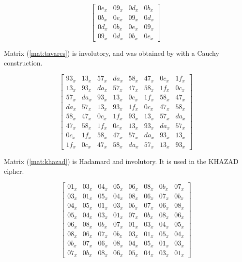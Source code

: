 \begin{equation}\label{mat:square-inv}
\begin{bmatrix}
0e_x & 09_x & 0d_x & 0b_x\\
0b_x & 0e_x & 09_x & 0d_x\\
0d_x & 0b_x & 0e_x & 09_x\\
09_x & 0d_x & 0b_x & 0e_x
\end{bmatrix}
\end{equation}

Matrix (\ref{mat:tavares}) is involutory, and was obtained by \cite{Youssef1997} with a Cauchy construction.

\begin{equation}\label{mat:tavares}
\begin{bmatrix}
93_x & 13_x & 57_x & da_x & 58_x & 47_x & 0c_x & 1f_x\\
13_x & 93_x & da_x & 57_x & 47_x & 58_x & 1f_x & 0c_x\\
57_x & da_x & 93_x & 13_x & 0c_x & 1f_x & 58_x & 47_x\\
da_x & 57_x & 13_x & 93_x & 1f_x & 0c_x & 47_x & 58_x\\
58_x & 47_x & 0c_x & 1f_x & 93_x & 13_x & 57_x & da_x\\
47_x & 58_x & 1f_x & 0c_x & 13_x & 93_x & da_x & 57_x\\
0c_x & 1f_x & 58_x & 47_x & 57_x & da_x & 93_x & 13_x\\
1f_x & 0c_x & 47_x & 58_x & da_x & 57_x & 13_x & 93_x
\end{bmatrix}
\end{equation}

Matrix (\ref{mat:khazad}) is Hadamard and involutory. It is used in the KHAZAD \cite{KHAZAD2000} cipher.

\begin{equation}\label{mat:khazad}
\begin{bmatrix}
01_x & 03_x & 04_x & 05_x & 06_x & 08_x & 0b_x & 07_x\\
03_x & 01_x & 05_x & 04_x & 08_x & 06_x & 07_x & 0b_x\\
04_x & 05_x & 01_x & 03_x & 0b_x & 07_x & 06_x & 08_x\\
05_x & 04_x & 03_x & 01_x & 07_x & 0b_x & 08_x & 06_x\\
06_x & 08_x & 0b_x & 07_x & 01_x & 03_x & 04_x & 05_x\\
08_x & 06_x & 07_x & 0b_x & 03_x & 01_x & 05_x & 04_x\\
0b_x & 07_x & 06_x & 08_x & 04_x & 05_x & 01_x & 03_x\\
07_x & 0b_x & 08_x & 06_x & 05_x & 04_x & 03_x & 01_x
\end{bmatrix}
\end{equation}

